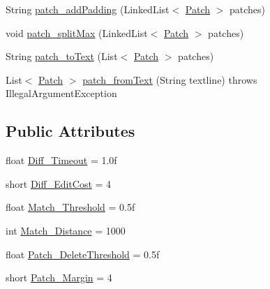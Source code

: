\begin{DoxyCompactItemize}
String \hyperlink{classorg_1_1buildmlearn_1_1toolkit_1_1utilities_1_1diff__match__patch_acf658679026e3da4d3180e6b749f04e6}{patch\+\_\+add\+Padding} (Linked\+List$<$ \hyperlink{classorg_1_1buildmlearn_1_1toolkit_1_1utilities_1_1diff__match__patch_1_1Patch}{Patch} $>$ patches)
\item 
void \hyperlink{classorg_1_1buildmlearn_1_1toolkit_1_1utilities_1_1diff__match__patch_a2f3ee2a30ba8ba85defd42f1b7c53a35}{patch\+\_\+split\+Max} (Linked\+List$<$ \hyperlink{classorg_1_1buildmlearn_1_1toolkit_1_1utilities_1_1diff__match__patch_1_1Patch}{Patch} $>$ patches)
\item 
String \hyperlink{classorg_1_1buildmlearn_1_1toolkit_1_1utilities_1_1diff__match__patch_a17e764e9b07c904d8884a1adeec12c96}{patch\+\_\+to\+Text} (List$<$ \hyperlink{classorg_1_1buildmlearn_1_1toolkit_1_1utilities_1_1diff__match__patch_1_1Patch}{Patch} $>$ patches)
\item 
List$<$ \hyperlink{classorg_1_1buildmlearn_1_1toolkit_1_1utilities_1_1diff__match__patch_1_1Patch}{Patch} $>$ \hyperlink{classorg_1_1buildmlearn_1_1toolkit_1_1utilities_1_1diff__match__patch_ad080e812febcb40743ac9225b4e2469c}{patch\+\_\+from\+Text} (String textline)  throws Illegal\+Argument\+Exception 
\end{DoxyCompactItemize}
\subsection*{Public Attributes}
\begin{DoxyCompactItemize}
\item 
float \hyperlink{classorg_1_1buildmlearn_1_1toolkit_1_1utilities_1_1diff__match__patch_a371b7d83d00f5e5f156f04a9b6337d1a}{Diff\+\_\+\+Timeout} = 1.\+0f
\item 
short \hyperlink{classorg_1_1buildmlearn_1_1toolkit_1_1utilities_1_1diff__match__patch_ac0bccfcdfb920ae47c6da51095154ab6}{Diff\+\_\+\+Edit\+Cost} = 4
\item 
float \hyperlink{classorg_1_1buildmlearn_1_1toolkit_1_1utilities_1_1diff__match__patch_acf187fceb374f31164a5256fb3bc9990}{Match\+\_\+\+Threshold} = 0.\+5f
\item 
int \hyperlink{classorg_1_1buildmlearn_1_1toolkit_1_1utilities_1_1diff__match__patch_aeec342cc294a0c3795d631ee1550a0da}{Match\+\_\+\+Distance} = 1000
\item 
float \hyperlink{classorg_1_1buildmlearn_1_1toolkit_1_1utilities_1_1diff__match__patch_a08c885bb96f00082195af6c8a4abf5b4}{Patch\+\_\+\+Delete\+Threshold} = 0.\+5f
\item 
short \hyperlink{classorg_1_1buildmlearn_1_1toolkit_1_1utilities_1_1diff__match__patch_a94f96bf3e770fd823e638f97fc51962a}{Patch\+\_\+\+Margin} = 4
\end{DoxyCompactItemize}
